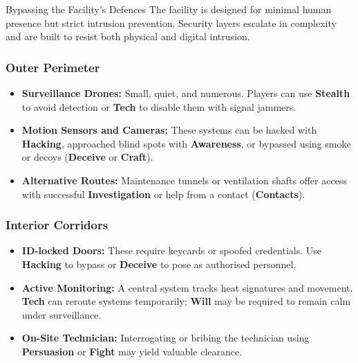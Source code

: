\begin{CommentBox}{Bypassing the Facility’s Defences}
    The facility is designed for minimal human presence but strict intrusion prevention. Security layers escalate in complexity and are built to resist both physical and digital intrusion.
    
    \vspace{0.5\baselineskip}
    
    \subsubsection*{Outer Perimeter}
    \begin{itemize}
        \item \textbf{Surveillance Drones:} Small, quiet, and numerous. Players can use \textbf{Stealth} to avoid detection or \textbf{Tech} to disable them with signal jammers.
        \item \textbf{Motion Sensors and Cameras:} These systems can be hacked with \textbf{Hacking}, approached blind spots with \textbf{Awareness}, or bypassed using smoke or decoys (\textbf{Deceive} or \textbf{Craft}).
        \item \textbf{Alternative Routes:} Maintenance tunnels or ventilation shafts offer access with successful \textbf{Investigation} or help from a contact (\textbf{Contacts}).
    \end{itemize}
    
    \vspace{0.5\baselineskip}
    
    \subsubsection*{Interior Corridors}
    \begin{itemize}
        \item \textbf{ID-locked Doors:} These require keycards or spoofed credentials. Use \textbf{Hacking} to bypass or \textbf{Deceive} to pose as authorised personnel.
        \item \textbf{Active Monitoring:} A central system tracks heat signatures and movement. \textbf{Tech} can reroute systems temporarily; \textbf{Will} may be required to remain calm under surveillance.
        \item \textbf{On-Site Technician:} Interrogating or bribing the technician using \textbf{Persuasion} or \textbf{Fight} may yield valuable clearance.
    \end{itemize}
    

\end{CommentBox}
